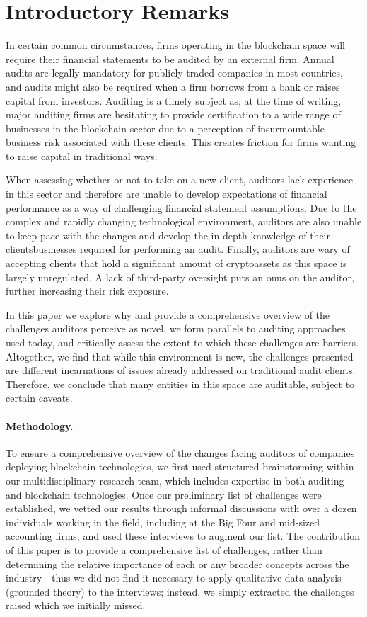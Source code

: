 \section{Introductory Remarks}

In certain common circumstances, firms operating in the blockchain space will require their financial statements to be audited by an external firm. Annual audits are legally mandatory for publicly traded companies in most countries, and audits might also be required when a firm borrows from a bank or raises capital from investors. Auditing is a timely subject as, at the time of writing, major auditing firms are hesitating to provide certification to a wide range of businesses in the blockchain sector due to a perception of insurmountable business risk associated with these clients.  This creates friction for firms wanting to raise capital in traditional ways. 

When assessing whether or not to take on a new client, auditors lack experience in this sector and therefore are unable to develop expectations of financial performance as a way of challenging financial statement assumptions. Due to the complex and rapidly changing technological environment, auditors are also unable to keep pace with the changes and develop the in-depth knowledge of their clients\textquotesingle  businesses required for performing an audit. Finally, auditors are wary of accepting clients that hold a significant amount of cryptoassets as this space is largely unregulated. A lack of third-party oversight puts an onus on the auditor, further increasing their risk exposure.  

In this paper we explore why and provide a comprehensive overview of the challenges auditors perceive as novel, we form parallels to auditing approaches used today, and critically assess the extent to which these challenges are barriers. Altogether, we find that while this environment is new, the challenges presented are different incarnations of issues already addressed on traditional audit clients. Therefore, we conclude that many entities in this space are auditable, subject to certain caveats. 


\paragraph{\textbf{Methodology.}} To ensure a comprehensive overview of the changes facing auditors of companies deploying blockchain technologies, we first used structured brainstorming within our multidisciplinary research team, which includes expertise in both auditing and blockchain technologies. Once our preliminary list of challenges were established, we vetted our results through informal discussions with over a dozen individuals working in the field, including at the Big Four and mid-sized accounting firms, and used these interviews to augment our list. The contribution of this paper is to provide a comprehensive list of challenges, rather than determining the relative importance of each or any broader concepts across the industry---thus we did not find it necessary to apply qualitative data analysis (\eg grounded theory) to the interviews; instead, we simply extracted the challenges raised which we initially missed.


